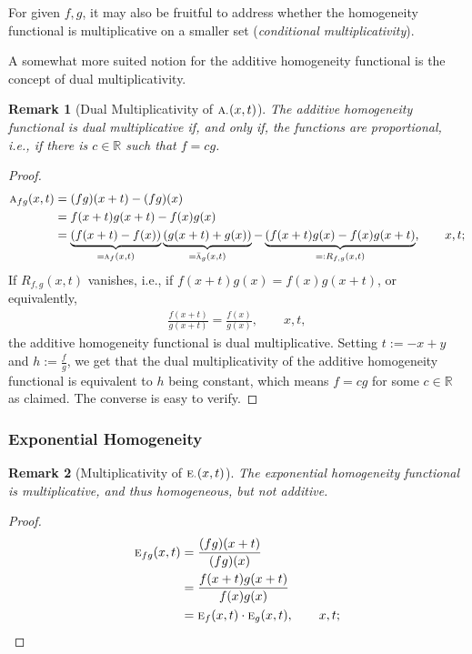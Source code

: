 \documentclass{amsart}
\theoremstyle{plain}
\newtheorem{remark}{Remark}
\numberwithin{equation}{section}
\newcommand{\term}[1]{\textit{#1}}
\newcommand{\ah}{\textsc{a}}
\newcommand{\eh}{\textsc{e}}
\newcommand{\R}{{\mathbb{R}}}
\begin{document}
 For given $f,g$, it may also be fruitful to address 
 whether the homogeneity functional is multiplicative on a smaller set
 (\term{conditional multiplicativity}).
 



A somewhat more suited notion for the additive homogeneity functional is the concept of dual multiplicativity.

\begin{remark}[Dual Multiplicativity of $\ah_{\cdot}(x,t)$]
The additive homogeneity functional is dual multiplicative
if, and only if, the functions are proportional, i.e.,
if there is $c \in \R$ such that $f= c g$.
\end{remark}

\begin{proof}
\begin{align*}
\ah_{fg}(x,t) &=
({fg})(x+t)-{(fg)(x)}\\
&=
f(x+t) g(x+t)-f(x)g(x) \\
&=
\underbrace{ (f(x+t) - f(x)) }_{ = \ah_f(x,t) } 
\underbrace{ (g(x+t) + g(x))}_{ = \bar{\ah}_g(x,t)} - \underbrace{( f(x+t) g(x) - f(x) g(x+t)}_{=:R_{f,g} (x,t)}, \qquad x,t;
\end{align*} 
If $R_{f,g} (x,t)$ vanishes, i.e., if $f(x+t) g(x) = f(x) g(x+t)$, 
or equivalently,
\begin{align*}
\frac{f(x+t)}{g(x+t)}= \frac{f(x)}{g(x)}, \qquad x,t,
\end{align*}
the additive homogeneity functional is dual multiplicative.
Setting $t:=-x+y$ and $h:=\frac{f}{g}$, we get that the dual multiplicativity of the additive homogeneity functional is equivalent to 
$h$ being constant, which means $f=c g$ for some $c \in \R$ as claimed.
The converse is easy to verify.
\end{proof}

\subsubsection{Exponential Homogeneity}
\begin{remark}[Multiplicativity of $\eh_{\cdot}(x,t)$]
The exponential homogeneity functional is multiplicative, and thus homogeneous, but not additive.
\end{remark}

\begin{proof}
\begin{align*}
\eh_{fg}(x,t) &=
\frac{({fg})(x+t)}{{(fg)(x)}}\\
&=
\frac{ f(x+t) g(x+t)}{{f(x) g(x)}}\\
&=
\eh_{f}(x,t) \cdot \eh_{g}(x,t), \qquad x,t;
\end{align*}
\end{proof}
\end{document}
